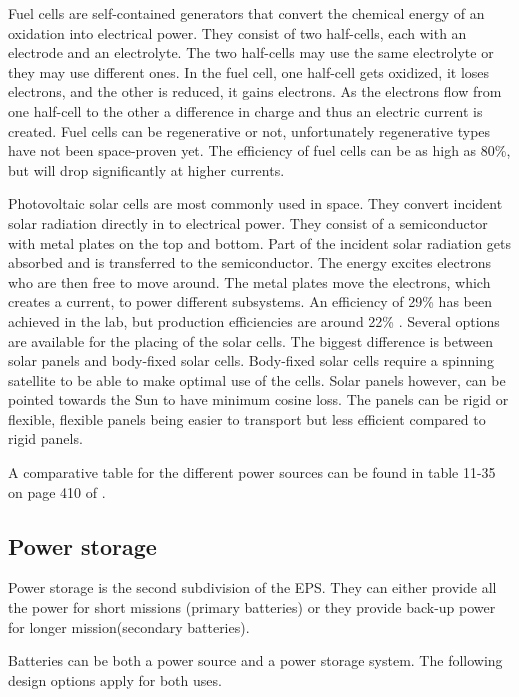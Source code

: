 Fuel cells are self-contained generators that convert the chemical energy of an oxidation into electrical power. They consist of two half-cells, each with an electrode and an electrolyte. The two half-cells may use the same electrolyte or they may use different ones. In the fuel cell, one half-cell gets oxidized, it loses electrons, and the other is reduced, it gains electrons. As the electrons flow from one half-cell to the other a difference in charge and thus an electric current is created. Fuel cells can be regenerative or not, unfortunately regenerative types have not been space-proven yet\cite{rees}. The efficiency of fuel cells can be as high as 80\%, but will drop significantly at higher currents.

Photovoltaic solar cells are most commonly used in space. They convert incident solar radiation directly in to electrical power. They consist of a semiconductor with metal plates on the top and bottom. Part of the incident solar radiation gets absorbed and is transferred to the semiconductor. The energy excites electrons who are then free to move around. The metal plates move the electrons, which creates a current, to power different subsystems. An efficiency of 29\% has been achieved \cite{doody1} in the lab, but production efficiencies are around 22\% \cite{larson}. Several options are available for the placing of the solar cells. The biggest difference is between solar panels and body-fixed solar cells. Body-fixed solar cells require a spinning satellite to be able to make optimal use of the cells. Solar panels however, can be pointed towards the Sun to have minimum cosine loss. The panels can be rigid or flexible, flexible panels being easier to transport but less efficient compared to rigid panels.

A comparative table for the different power sources can be found in table 11-35 on page 410 of \cite{larson}.

\subsection{Power storage}
\label{blDOstorage}

Power storage is the second subdivision of the \ac{EPS}. They can either provide all the power for short missions (primary batteries) or they provide back-up power for longer mission(secondary batteries).

Batteries can be both a power source and a power storage system. The following design options apply for both uses.

